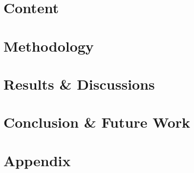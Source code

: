 \documentclass[%
]{tumDiss}
\begin{document}
\chapter{Content}
\label{chap:content}


\chapter{Methodology}
\label{chap:methodology}


\chapter{Results \& Discussions}
\label{chap:results}



\chapter{Conclusion \& Future Work}
\label{chap:conclusion}



\backmatter




\appendix
\chapter{Appendix}



\end{document}
